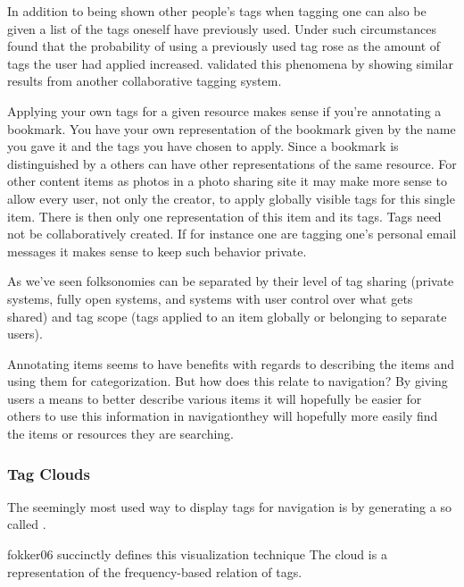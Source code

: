 In addition to being shown other people's tags when tagging one can also
be given a list of the tags oneself have previously used.
Under such circumstances \citet[]{sen06} found that the probability
of using a previously used tag rose as the amount of tags the user had
applied increased. \citet[]{farooq07} validated this phenomena
by showing similar results from another collaborative tagging system.

Applying your own tags for a given resource makes sense if you're annotating a
bookmark. You have your own representation of the bookmark given by the name
you gave it and the tags you have chosen to apply. Since a bookmark is
distinguished by a  others can have other representations of the
same resource. For other content items as photos in a photo sharing site it
may make more sense to allow every user, not only the creator, to apply
globally visible tags for this single item. There is then only one
representation of this item and its tags.
Tags need not be collaboratively created. If for instance one are tagging
one's personal email messages it makes sense to keep such behavior private.

As we've seen folksonomies can be separated by their level of tag sharing
(private systems, fully open systems, and systems with user control over
what gets shared) and tag scope (tags applied to an item globally
or belonging to separate users).%

Annotating items seems to have benefits with regards to describing the items
and using them for categorization. But how does this relate to navigation?
By giving users a means to better describe various items it will hopefully be
easier for others to use this information in navigation\dash{}they will
hopefully more easily find the items or resources they are searching.

\subsubsection{Tag Clouds}

The seemingly most used way to display tags for navigation is by generating
a so called .%
\begin{fullquote}[\p{1}]{fokker06}{%
  succinctly defines this visualization technique}
    The cloud is a representation of the frequency-based relation of tags.
\end{fullquote}

